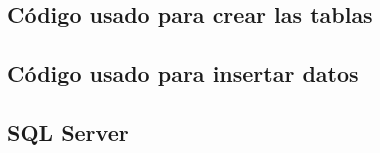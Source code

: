 \documentclass[a4paper,12pt]{article}
\begin{document}
\subsection{Código usado para crear las tablas}


\break

\subsection{Código usado para insertar datos}



\onecolumn


\subsection{SQL Server}
\end{document}
